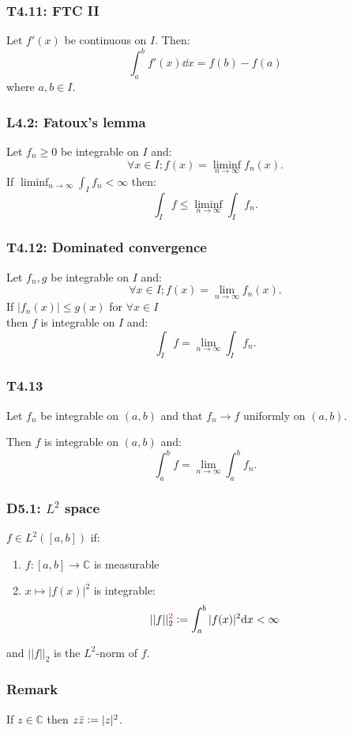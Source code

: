 \documentclass{article}
\newcommand{\deq}{\vcentcolon=}
\begin{document}
\begin{multicols*}{3}
\subsubsection*{T4.11: FTC II}
Let $f'(x)$ be continuous on $I$. Then:
$$\int_{a}^{b}f'(x)\dd x=f(b)-f(a)$$
where $a,b\in I$.

\subsubsection*{L4.2: Fatoux's lemma}
Let $f_n\geq0$ be integrable on $I$ and:
$$\forall x\in I;f(x)=\liminf_{n\rightarrow\infty}f_n(x).$$
If $\displaystyle\liminf_{n\rightarrow\infty}
\int_I f_n<\infty$ then:
$$\int_I f\leq\liminf_{n\rightarrow\infty}\int_I f_n.$$

\subsubsection*{T4.12: Dominated convergence}
Let $f_n,g$ be integrable on $I$ and:
$$\forall x\in I; f(x)=\lim_{n\rightarrow\infty}f_n(x).$$
If $|f_n(x)|\leq g(x)$ for $\forall x\in I$ \\
then $f$ is integrable on $I$ and:
$$\int_I f=\lim_{n\rightarrow\infty}\int_I f_n.$$

\subsubsection*{T4.13}
Let $f_n$ be integrable on $(a,b)$ and that
$f_n\rightarrow f$ uniformly on $(a,b)$.

Then $f$ is integrable on $(a,b)$ and:
$$\int_{a}^{b}f=\lim_{n\rightarrow\infty}\int_{a}^{b}f_n.$$

\subsubsection*{D5.1: $L^2$ space}
$f\in L^2([a,b])$ if:
\begin{enumerate}
    \item $f:[a,b]\rightarrow\mathbb{C}$ is measurable

    \item $x\mapsto|f(x)|^2$
    is integrable:
    $$||f||_2^{\textcolor{red}{2}}\deq
    \int_{a}^{b}|f(x)|^2\dd x<\infty$$
\end{enumerate}
and $||f||_2$ is the $L^2$-norm of $f$.

\subsubsection*{Remark}
If $z\in\mathbb{C}$ then $z\bar{z}\deq|z|^2$.


\end{multicols*}
\end{document}

